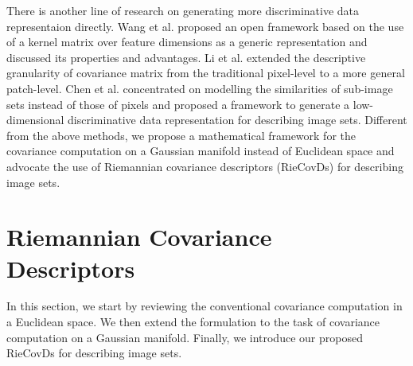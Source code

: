 \documentclass[review]{elsarticle}
\begin{document}
	There is another line of research on generating more discriminative data representaion directly.  Wang et al.\cite{wang2015beyond} proposed an open framework based on the use of a kernel matrix over feature dimensions as a generic representation and discussed its properties and advantages. Li et al.\cite{li2016spatial} extended the descriptive granularity of covariance matrix from the traditional pixel-level to a more general patch-level. Chen et al.\cite{chen2018Component} concentrated on modelling the similarities of  sub-image sets instead of those of pixels and proposed a framework to generate a low-dimensional discriminative data representation for describing image sets. Different from the above methods, we propose a mathematical framework for the covariance computation on a Gaussian manifold instead of Euclidean space and advocate the use of  Riemannian covariance descriptors (RieCovDs) for describing image sets.
\section{Riemannian Covariance Descriptors}
	In this section, we start by reviewing the conventional covariance computation in a Euclidean space. We then extend the formulation to the task of covariance computation on a Gaussian manifold. Finally, we introduce our proposed RieCovDs for describing image sets.
	 
\end{document}

